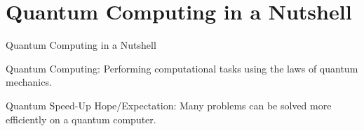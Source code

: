\section{Quantum Computing in a Nutshell}

\begin{frame}{Quantum Computing in a Nutshell}

\begin{block}{Quantum Computing:}
 Performing computational tasks using the laws of quantum mechanics.
\end{block}




\end{frame}

\begin{frame}{Quantum Speed-Up}
 \alert{Hope/Expectation:} Many problems can be solved more efficiently on a quantum computer.
 
\end{frame}

